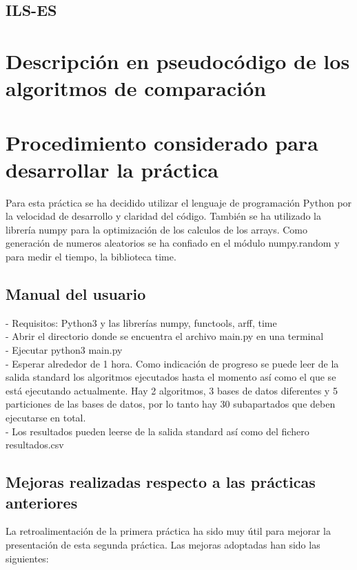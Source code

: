 \documentclass[12pt, spanish]{article}
\begin{document}
\subsection{ILS-ES}
\pagebreak

\section{Descripción en pseudocódigo de los algoritmos de comparación}

\pagebreak

\section{Procedimiento considerado para desarrollar la práctica}
Para esta práctica se ha decidido utilizar el lenguaje de programación Python por la velocidad de desarrollo y claridad del código. También se ha utilizado la librería numpy para la optimización de los calculos de los arrays. Como generación de numeros aleatorios se ha confiado en el módulo numpy.random y para medir el tiempo, la biblioteca time.  
\pagebreak
\subsection{Manual del usuario}
- Requisitos: Python3 y las librerías numpy, functools, arff, time \\
- Abrir el directorio donde se encuentra el archivo main.py en una terminal\\ 
- Ejecutar python3 main.py\\ 
- Esperar alrededor de 1 hora. Como indicación de progreso se puede leer de la salida standard los algoritmos ejecutados hasta el momento así como el que se está ejecutando actualmente. Hay 2 algoritmos, 3 bases de datos diferentes y 5 particiones de las bases de datos, por lo tanto hay 30 subapartados que deben ejecutarse en total.\\ 
- Los resultados pueden leerse de la salida standard así como del fichero resultados.csv\\
\subsection{Mejoras realizadas respecto a las prácticas anteriores}
La retroalimentación de la primera práctica ha sido muy útil para mejorar la presentación de esta segunda práctica. Las mejoras adoptadas han sido las siguientes:\\
\end{document}
